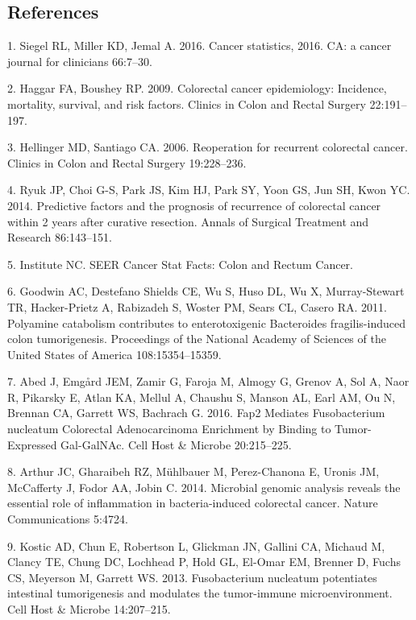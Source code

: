 \documentclass[12pt,]{article}
\begin{document}
\subsection{References}\label{references}

\hypertarget{refs}{}
\hypertarget{ref-siegel_cancer_2016}{}
1. Siegel RL, Miller KD, Jemal A. 2016. Cancer statistics, 2016. CA: a
cancer journal for clinicians 66:7--30.

\hypertarget{ref-haggar_colorectal_2009}{}
2. Haggar FA, Boushey RP. 2009. Colorectal cancer epidemiology:
Incidence, mortality, survival, and risk factors. Clinics in Colon and
Rectal Surgery 22:191--197.

\hypertarget{ref-hellinger_reoperation_2006}{}
3. Hellinger MD, Santiago CA. 2006. Reoperation for recurrent colorectal
cancer. Clinics in Colon and Rectal Surgery 19:228--236.

\hypertarget{ref-ryuk_predictive_2014}{}
4. Ryuk JP, Choi G-S, Park JS, Kim HJ, Park SY, Yoon GS, Jun SH, Kwon
YC. 2014. Predictive factors and the prognosis of recurrence of
colorectal cancer within 2 years after curative resection. Annals of
Surgical Treatment and Research 86:143--151.

\hypertarget{ref-national_cancer_institute_seer_nodate}{}
5. Institute NC. SEER Cancer Stat Facts: Colon and Rectum Cancer.

\hypertarget{ref-goodwin_polyamine_2011}{}
6. Goodwin AC, Destefano Shields CE, Wu S, Huso DL, Wu X, Murray-Stewart
TR, Hacker-Prietz A, Rabizadeh S, Woster PM, Sears CL, Casero RA. 2011.
Polyamine catabolism contributes to enterotoxigenic Bacteroides
fragilis-induced colon tumorigenesis. Proceedings of the National
Academy of Sciences of the United States of America 108:15354--15359.

\hypertarget{ref-abed_fap2_2016}{}
7. Abed J, Emgård JEM, Zamir G, Faroja M, Almogy G, Grenov A, Sol A,
Naor R, Pikarsky E, Atlan KA, Mellul A, Chaushu S, Manson AL, Earl AM,
Ou N, Brennan CA, Garrett WS, Bachrach G. 2016. Fap2 Mediates
Fusobacterium nucleatum Colorectal Adenocarcinoma Enrichment by Binding
to Tumor-Expressed Gal-GalNAc. Cell Host \& Microbe 20:215--225.

\hypertarget{ref-arthur_microbial_2014}{}
8. Arthur JC, Gharaibeh RZ, Mühlbauer M, Perez-Chanona E, Uronis JM,
McCafferty J, Fodor AA, Jobin C. 2014. Microbial genomic analysis
reveals the essential role of inflammation in bacteria-induced
colorectal cancer. Nature Communications 5:4724.

\hypertarget{ref-kostic_fusobacterium_2013}{}
9. Kostic AD, Chun E, Robertson L, Glickman JN, Gallini CA, Michaud M,
Clancy TE, Chung DC, Lochhead P, Hold GL, El-Omar EM, Brenner D, Fuchs
CS, Meyerson M, Garrett WS. 2013. Fusobacterium nucleatum potentiates
intestinal tumorigenesis and modulates the tumor-immune
microenvironment. Cell Host \& Microbe 14:207--215.
\end{document}
